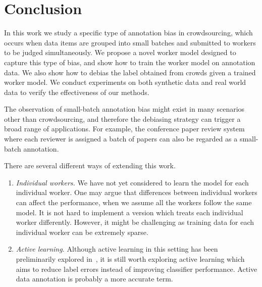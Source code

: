 \section{Conclusion}
\label{sec:conclusion}

In this work we study a specific type of annotation bias in crowdsourcing, 
which occurs when data items are grouped into small batches 
and submitted to workers to be judged simultaneously.  
We propose a novel worker model designed to capture this type of bias, 
and show how to train the worker model on annotation data.  
We also show how to debias the label obtained from crowds given a trained worker model.  
We conduct experiments on both synthetic data and real world data to verify the effectiveness of our methods.  

The observation of small-batch annotation bias might exist in many scenarios other than crowdsourcing, 
and therefore the debiasing strategy can trigger a broad range of applications. 
For example, the conference paper review system where each reviewer is assigned a batch of papers 
can also be regarded as a small-batch annotation.  

There are several different ways of extending this work.  
\begin{enumerate}
  \item \emph{Individual workers.}
        We have not yet considered to learn the model for each individual worker.  
        One may argue that differences between individual workers can affect the performance, 
        when we assume all the workers follow the same model.  
        It is not hard to implement a version which treats each individual worker differently.  
        However, it might be challenging as training data for each individual worker can be extremely sparse.  
  \item \emph{Active learning.}
        Although active learning in this setting has been preliminarily explored in~\cite{zhuang:wsdm2015}, 
        it is still worth exploring active learning which aims to reduce label errors instead of improving classifier performance.  
        Active data annotation is probably a more accurate term.  
\end{enumerate} 